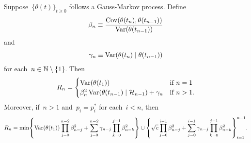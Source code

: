 \documentclass[11pt,oneside]{article}
\begin{document}
\begin{lemma}
    \label{lem:residual-variance-markov}
    Suppose~$\{\theta(t)\}_{t\ge0}$ follows a Gauss-Markov process.
    Define
    \[ \beta_n\equiv\frac{\operatorname{Cov}(\theta(t_n),\theta(t_{n-1}))}{\operatorname{Var}(\theta(t_{n-1}))} \]
    and
    \[ \gamma_n\equiv\operatorname{Var}(\theta(t_n)\mid\theta(t_{n-1})) \]
    for each~$n\in\mathbb{N}\setminus\{1\}$.
    Then
    \begin{equation}
        R_n=\begin{cases}
            \operatorname{Var}(\theta(t_1)) & \text{if}\ n=1 \\
            \beta_n^2\operatorname{Var}(\theta(t_{n-1})\mid\mathcal{H}_{n-1})+\gamma_n & \text{if}\ n>1.
        \end{cases} \label{eq:residual-variance-markov}
    \end{equation}
    Moreover, if~$n>1$ and~$p_i=p_i^*$ for each~$i<n$, then
    \begin{equation}
        R_n=\min\left\{\Var(\theta(t_1))\prod_{j=0}^{n-2}\beta_{n-j}^2+\sum_{j=0}^{n-2}\gamma_{n-j}\prod_{k=0}^{j-1}\beta_{n-k}^2\right\}\cup\left\{\sqrt{c}\prod_{j=0}^{i-1}\beta_{n-j}^2+\sum_{j=0}^{i-1}\gamma_{n-j}\prod_{k=0}^{j-1}\beta_{n-k}^2\right\}_{i=1}^{n-1}. \label{eq:residual-variance-markov-closed}
    \end{equation}
\end{lemma}
%
\end{document}
